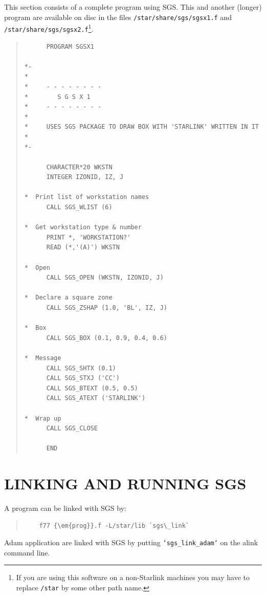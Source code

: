 \documentclass[11pt]{article}
\begin{document}
This section consists of a complete program using SGS.  This
and another (longer) program are available on disc in the
files {\tt /star/share/sgs/sgsx1.f} and 
{\tt /star/share/sgs/sgsx2.f}\footnote{If you are using this 
software on a non-Starlink machines you may have to replace {\tt /star} by some
other path name.}. 
\begin{quote}
\begin{verbatim}
      PROGRAM SGSX1

*-
*
*     - - - - - - - -
*        S G S X 1
*     - - - - - - - -
*
*     USES SGS PACKAGE TO DRAW BOX WITH 'STARLINK' WRITTEN IN IT
*
*-

      CHARACTER*20 WKSTN
      INTEGER IZONID, IZ, J 

*  Print list of workstation names
      CALL SGS_WLIST (6)

*  Get workstation type & number
      PRINT *, 'WORKSTATION?'
      READ (*,'(A)') WKSTN

*  Open
      CALL SGS_OPEN (WKSTN, IZONID, J)

*  Declare a square zone
      CALL SGS_ZSHAP (1.0, 'BL', IZ, J)

*  Box
      CALL SGS_BOX (0.1, 0.9, 0.4, 0.6)

*  Message
      CALL SGS_SHTX (0.1)
      CALL SGS_STXJ ('CC')
      CALL SGS_BTEXT (0.5, 0.5)
      CALL SGS_ATEXT ('STARLINK')

*  Wrap up
      CALL SGS_CLOSE

      END
\end{verbatim}
\end{quote}          

\appendix
\section {LINKING AND RUNNING SGS}\label{app-linking}

A program can be linked with SGS by:
\begin{quote}
\begin{verbatim}
    f77 {\em{prog}}.f -L/star/lib `sgs\_link`
\end{verbatim}
\end{quote}
Adam application are linked with SGS by putting {\tt `sgs\_link\_adam`} on
the alink command line.
\end{document}
